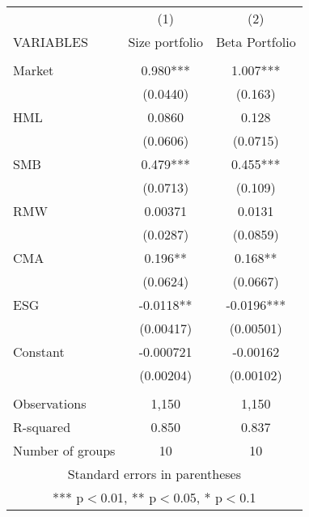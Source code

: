 \begin{tabular}{lcc} \hline
 & (1) & (2) \\
VARIABLES & Size portfolio & Beta Portfolio \\ \hline
 &  &  \\
Market & 0.980*** & 1.007*** \\
 & (0.0440) & (0.163) \\
HML & 0.0860 & 0.128 \\
 & (0.0606) & (0.0715) \\
SMB & 0.479*** & 0.455*** \\
 & (0.0713) & (0.109) \\
RMW & 0.00371 & 0.0131 \\
 & (0.0287) & (0.0859) \\
CMA & 0.196** & 0.168** \\
 & (0.0624) & (0.0667) \\
ESG & -0.0118** & -0.0196*** \\
 & (0.00417) & (0.00501) \\
Constant & -0.000721 & -0.00162 \\
 & (0.00204) & (0.00102) \\
 &  &  \\
Observations & 1,150 & 1,150 \\
R-squared & 0.850 & 0.837 \\
 Number of groups & 10 & 10 \\ \hline
\multicolumn{3}{c}{ Standard errors in parentheses} \\
\multicolumn{3}{c}{ *** p$<$0.01, ** p$<$0.05, * p$<$0.1} \\
\end{tabular}

